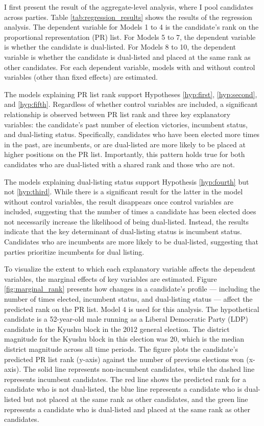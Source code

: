 \documentclass[a4paper, 11pt]{article}
\begin{document}
I first present the result of the aggregate-level analysis, where I pool candidates across parties. Table \ref{tab:regression_results} shows the results of the regression analysis. The dependent variable for Models 1 to 4 is the candidate’s rank on the proportional representation (PR) list. For Models 5 to 7, the dependent variable is whether the candidate is dual-listed. For Models 8 to 10, the dependent variable is whether the candidate is dual-listed and placed at the same rank as other candidates. For each dependent variable, models with and without control variables (other than fixed effects) are estimated.



The models explaining PR list rank support Hypotheses \ref{hyp:first}, \ref{hyp:second}, and \ref{hyp:fifth}. Regardless of whether control variables are included, a significant relationship is observed between PR list rank and three key explanatory variables: the candidate’s past number of election victories, incumbent status, and dual-listing status. Specifically, candidates who have been elected more times in the past, are incumbents, or are dual-listed are more likely to be placed at higher positions on the PR list. Importantly, this pattern holds true for both candidates who are dual-listed with a shared rank and those who are not.

The models explaining dual-listing status support Hypothesis \ref{hyp:fourth} but not \ref{hyp:third}. While there is a significant result for the latter in the model without control variables, the result disappears once control variables are included, suggesting that the number of times a candidate has been elected does not necessarily increase the likelihood of being dual-listed. Instead, the results indicate that the key determinant of dual-listing status is incumbent status. Candidates who are incumbents are more likely to be dual-listed, suggesting that parties prioritize incumbents for dual listing.

To visualize the extent to which each explanatory variable affects the dependent variables, the marginal effects of key variables are estimated. Figure \ref{fig:marginal_rank} presents how changes in a candidate’s profile — including the number of times elected, incumbent status, and dual-listing status — affect the predicted rank on the PR list. Model 4 is used for this analysis. The hypothetical candidate is a 52-year-old male running as a Liberal Democratic Party (LDP) candidate in the Kyushu block in the 2012 general election. The district magnitude for the Kyushu block in this election was 20, which is the median district magnitude across all time periods. The figure plots the candidate’s predicted PR list rank (y-axis) against the number of previous elections won (x-axis). The solid line represents non-incumbent candidates, while the dashed line represents incumbent candidates. The red line shows the predicted rank for a candidate who is not dual-listed, the blue line represents a candidate who is dual-listed but not placed at the same rank as other candidates, and the green line represents a candidate who is dual-listed and placed at the same rank as other candidates.
\end{document}
